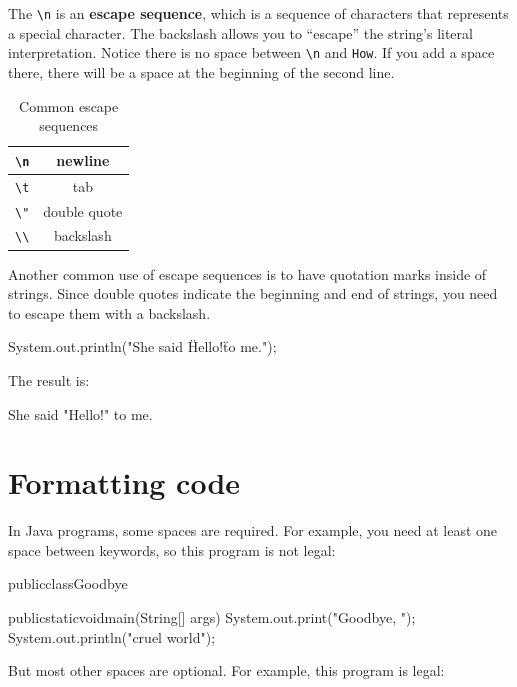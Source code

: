 \documentclass[12pt]{book}
\theoremstyle{exercise}
\begin{document}
The \verb"\n" is an {\bf escape sequence}, which is a sequence of characters that represents a special character.
The backslash allows you to ``escape'' the string's literal interpretation.
Notice there is no space between \verb"\n" and \verb"How".
If you add a space there, there will be a space at the beginning of the second line.

\begin{table}[!ht]
\begin{center}
\begin{tabular}{|c|c|}
\hline
\verb"\n" & newline \\
\hline
\verb"\t" & tab \\
\hline
\verb'\"' & double quote \\
\hline
\verb"\\" & backslash \\
\hline
\end{tabular}
\caption{Common escape sequences}
\end{center}
\end{table}

Another common use of escape sequences is to have quotation marks inside of strings.
Since double quotes indicate the beginning and end of strings, you need to escape them with a backslash.

\begin{code}
    System.out.println("She said \"Hello!\" to me.");
\end{code}

The result is:

\begin{stdout}
She said "Hello!" to me.
\end{stdout}


\section{Formatting code}
\label{formatting}

In Java programs, some spaces are required.
For example, you need at least one space between keywords, so this program is not legal:

\begin{code}
publicclassGoodbye{

    publicstaticvoidmain(String[] args) {
        System.out.print("Goodbye, ");
        System.out.println("cruel world");
    }
}
\end{code}

But most other spaces are optional.
For example, this program is legal:
\end{document}

